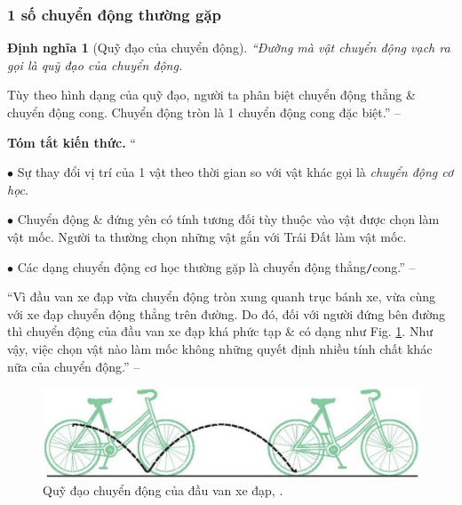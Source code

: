 \documentclass{article}
\numberwithin{equation}{section}
\newtheorem{dinhnghia}{Định nghĩa}[section]
\begin{document}
\subsubsection{1 số chuyển động thường gặp}

\begin{dinhnghia}[Quỹ đạo của chuyển động]
	 ``Đường mà vật chuyển động vạch ra gọi là \emph{quỹ đạo của chuyển động}.
\end{dinhnghia}
Tùy theo hình dạng của quỹ đạo, người ta phân biệt chuyển động thẳng \& chuyển động cong. Chuyển động tròn là 1 chuyển động cong đặc biệt.'' -- \cite[p. 6]{SGK_Vat_Ly_8}
\vspace{2mm}

\noindent\textbf{Tóm tắt kiến thức.}
``\begin{enumerate*}
	\item[$\bullet$] Sự thay đổi vị trí của 1 vật theo thời gian so với vật khác gọi là \textit{chuyển động cơ học}.
	\item[$\bullet$] Chuyển động \& đứng yên có tính tương đối tùy thuộc vào vật được chọn làm vật mốc. Người ta thường chọn những vật gắn với Trái Đất làm vật mốc.
	\item[$\bullet$] Các dạng chuyển động cơ học thường gặp là chuyển động thẳng\texttt{/}cong.'' -- \cite[p. 7]{SGK_Vat_Ly_8}
\end{enumerate*}

``Vì đầu van xe đạp vừa chuyển động tròn xung quanh trục bánh xe, vừa cùng với xe đạp chuyển động thẳng trên đường. Do đó, đối với người đứng bên đường thì chuyển động của đầu van xe đạp khá phức tạp \& có dạng như Fig. \ref{fig:quy_dao_chuyen_dong_dau_van_xe_dap}. Như vậy, việc chọn vật nào làm mốc không những quyết định nhiều tính chất khác nữa của chuyển động.'' -- \cite[p. 7]{SGK_Vat_Ly_8}

\begin{figure}[h]
	\centering
	\includegraphics[scale=0.15]{quy_dao_chuyen_dong_dau_van_xe_dap}
	\caption{Quỹ đạo chuyển động của đầu van xe đạp, \cite[Hình 1.5, p. 7]{SGK_Vat_Ly_8}.}
	\label{fig:quy_dao_chuyen_dong_dau_van_xe_dap}
\end{figure}

\end{document}
